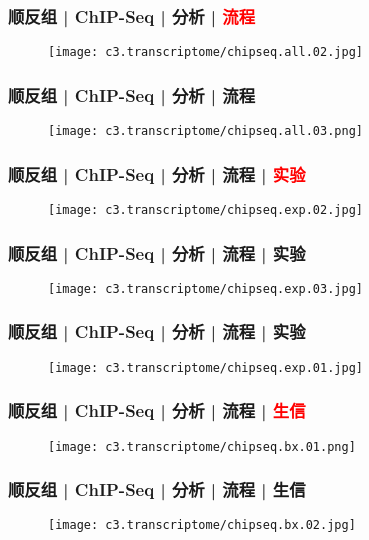 \begin{frame}
  \frametitle{顺反组 | ChIP-Seq | 分析 | \textcolor{red}{流程}}
  \begin{figure}
    \centering
    \texttt{[image: c3.transcriptome/chipseq.all.02.jpg]}
  \end{figure}
\end{frame}

\begin{frame}
  \frametitle{顺反组 | ChIP-Seq | 分析 | 流程}
  \begin{figure}
    \centering
    \texttt{[image: c3.transcriptome/chipseq.all.03.png]}
  \end{figure}
\end{frame}

\begin{frame}
  \frametitle{顺反组 | ChIP-Seq | 分析 | 流程 | \textcolor{red}{实验}}
  \begin{figure}
    \centering
    \texttt{[image: c3.transcriptome/chipseq.exp.02.jpg]}
  \end{figure}
\end{frame}

\begin{frame}
  \frametitle{顺反组 | ChIP-Seq | 分析 | 流程 | 实验}
  \begin{figure}
    \centering
    \texttt{[image: c3.transcriptome/chipseq.exp.03.jpg]}
  \end{figure}
\end{frame}

\begin{frame}
  \frametitle{顺反组 | ChIP-Seq | 分析 | 流程 | 实验}
  \begin{figure}
    \centering
    \texttt{[image: c3.transcriptome/chipseq.exp.01.jpg]}
  \end{figure}
\end{frame}

\begin{frame}
  \frametitle{顺反组 | ChIP-Seq | 分析 | 流程 | \textcolor{red}{生信}}
  \begin{figure}
    \centering
    \texttt{[image: c3.transcriptome/chipseq.bx.01.png]}
  \end{figure}
\end{frame}

\begin{frame}
  \frametitle{顺反组 | ChIP-Seq | 分析 | 流程 | 生信}
  \begin{figure}
    \centering
    \texttt{[image: c3.transcriptome/chipseq.bx.02.jpg]}
  \end{figure}
\end{frame}

